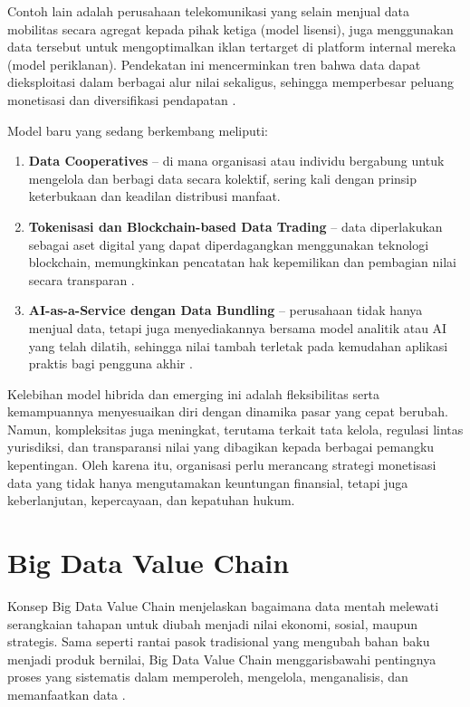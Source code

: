 Contoh lain adalah perusahaan telekomunikasi yang selain menjual data mobilitas secara agregat kepada pihak ketiga (model lisensi), juga menggunakan data tersebut untuk mengoptimalkan iklan tertarget di platform internal mereka (model periklanan). Pendekatan ini mencerminkan tren bahwa data dapat dieksploitasi dalam berbagai alur nilai sekaligus, sehingga memperbesar peluang monetisasi dan diversifikasi pendapatan \cite{hartmann2016data}. 

Model baru yang sedang berkembang meliputi:  

\begin{enumerate}
	\item \textbf{Data Cooperatives} – di mana organisasi atau individu bergabung untuk mengelola dan berbagi data secara kolektif, sering kali dengan prinsip keterbukaan dan keadilan distribusi manfaat.  
	
	\item \textbf{Tokenisasi dan Blockchain-based Data Trading} – data diperlakukan sebagai aset digital yang dapat diperdagangkan menggunakan teknologi blockchain, memungkinkan pencatatan hak kepemilikan dan pembagian nilai secara transparan \cite{jian2021blockchain}.  
	
	\item \textbf{AI-as-a-Service dengan Data Bundling} – perusahaan tidak hanya menjual data, tetapi juga menyediakannya bersama model analitik atau AI yang telah dilatih, sehingga nilai tambah terletak pada kemudahan aplikasi praktis bagi pengguna akhir \cite{fernandez2020}.  
\end{enumerate}

Kelebihan model hibrida dan emerging ini adalah fleksibilitas serta kemampuannya menyesuaikan diri dengan dinamika pasar yang cepat berubah. Namun, kompleksitas juga meningkat, terutama terkait tata kelola, regulasi lintas yurisdiksi, dan transparansi nilai yang dibagikan kepada berbagai pemangku kepentingan. Oleh karena itu, organisasi perlu merancang strategi monetisasi data yang tidak hanya mengutamakan keuntungan finansial, tetapi juga keberlanjutan, kepercayaan, dan kepatuhan hukum. 


\section{Big Data Value Chain}

Konsep Big Data Value Chain menjelaskan bagaimana data mentah melewati serangkaian tahapan untuk diubah menjadi nilai ekonomi, sosial, maupun strategis. Sama seperti rantai pasok tradisional yang mengubah bahan baku menjadi produk bernilai, Big Data Value Chain menggarisbawahi pentingnya proses yang sistematis dalam memperoleh, mengelola, menganalisis, dan memanfaatkan data \cite{curry2016, opendatawatch2020}. 

